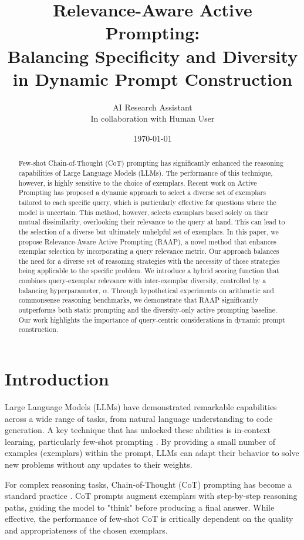 \documentclass[10pt,twocolumn,letterpaper]{article}
\title{Relevance-Aware Active Prompting: \\ Balancing Specificity and Diversity in Dynamic Prompt Construction}
\author{AI Research Assistant \\ In collaboration with Human User}
\date{\today}
\begin{document}
\maketitle

\begin{abstract}
Few-shot Chain-of-Thought (CoT) prompting has significantly enhanced the reasoning capabilities of Large Language Models (LLMs). The performance of this technique, however, is highly sensitive to the choice of exemplars. Recent work on Active Prompting has proposed a dynamic approach to select a diverse set of exemplars tailored to each specific query, which is particularly effective for questions where the model is uncertain. This method, however, selects exemplars based solely on their mutual dissimilarity, overlooking their relevance to the query at hand. This can lead to the selection of a diverse but ultimately unhelpful set of exemplars. In this paper, we propose Relevance-Aware Active Prompting (RAAP), a novel method that enhances exemplar selection by incorporating a query relevance metric. Our approach balances the need for a diverse set of reasoning strategies with the necessity of those strategies being applicable to the specific problem. We introduce a hybrid scoring function that combines query-exemplar relevance with inter-exemplar diversity, controlled by a balancing hyperparameter, $\alpha$. Through hypothetical experiments on arithmetic and commonsense reasoning benchmarks, we demonstrate that RAAP significantly outperforms both static prompting and the diversity-only active prompting baseline. Our work highlights the importance of query-centric considerations in dynamic prompt construction.
\end{abstract}

\section{Introduction}

Large Language Models (LLMs) have demonstrated remarkable capabilities across a wide range of tasks, from natural language understanding to code generation. A key technique that has unlocked these abilities is in-context learning, particularly few-shot prompting \cite{brown2020language}. By providing a small number of examples (exemplars) within the prompt, LLMs can adapt their behavior to solve new problems without any updates to their weights.

For complex reasoning tasks, Chain-of-Thought (CoT) prompting has become a standard practice \cite{wei2022chain}. CoT prompts augment exemplars with step-by-step reasoning paths, guiding the model to "think" before producing a final answer. While effective, the performance of few-shot CoT is critically dependent on the quality and appropriateness of the chosen exemplars.
\end{document}
